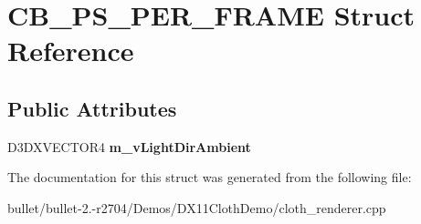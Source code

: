 \hypertarget{struct_c_b___p_s___p_e_r___f_r_a_m_e}{\section{C\+B\+\_\+\+P\+S\+\_\+\+P\+E\+R\+\_\+\+F\+R\+A\+M\+E Struct Reference}
\label{struct_c_b___p_s___p_e_r___f_r_a_m_e}
}
\subsection*{Public Attributes}
\begin{DoxyCompactItemize}
\item 
\hypertarget{struct_c_b___p_s___p_e_r___f_r_a_m_e_a55830098d407e7846835fd5946ac6e7e}{D3\+D\+X\+V\+E\+C\+T\+O\+R4 {\bfseries m\+\_\+v\+Light\+Dir\+Ambient}}\label{struct_c_b___p_s___p_e_r___f_r_a_m_e_a55830098d407e7846835fd5946ac6e7e}

\end{DoxyCompactItemize}


The documentation for this struct was generated from the following file\+:\begin{DoxyCompactItemize}
\item 
bullet/bullet-\/2.-\/r2704/\+Demos/\+D\+X11\+Cloth\+Demo/cloth\+\_\+renderer.\+cpp\end{DoxyCompactItemize}
